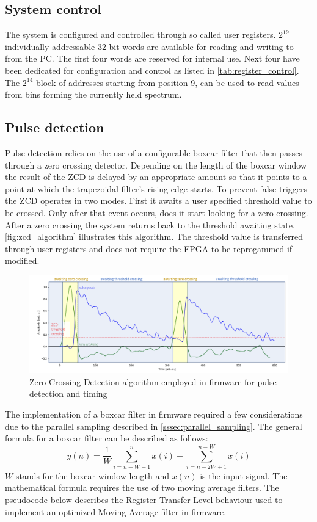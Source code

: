 \subsection{System control}

The system is configured and controlled through so called 
user registers. $2^{19}$ individually addressable 32-bit words
are available for reading and writing to from the PC. The first
four words are reserved for internal use. Next four have been 
dedicated for configuration and control as listed in \autoref{tab:register_control}.
The $2^{14}$ block of addresses starting from position 9, can
be used to read values from bins forming the currently held spectrum.

\subsection{Pulse detection}
Pulse detection relies on the use of a configurable boxcar filter
that then passes through a zero crossing detector. Depending on the
length of the boxcar window the result of the ZCD is delayed by an appropriate
amount so that it points to a point at which the trapezoidal filter's 
rising edge starts. To prevent false triggers the ZCD operates in two modes.
First it awaits a user specified threshold value to be crossed. Only after
that event occurs, does it start looking for a zero crossing.
After a zero crossing the system returns back to the threshold awaiting state.
\autoref{fig:zcd_algorithm} illustrates this algorithm. 
The threshold value is transferred through user registers and does not require
the FPGA to be reprogammed if modified.

\begin{figure}[H]
  \centering
  \includegraphics[width=\linewidth]{media/zcd_algorithm.png}
  \caption{Zero Crossing Detection algorithm employed in firmware for pulse detection and timing}
  \label{fig:zcd_algorithm} 
\end{figure}


The implementation of a boxcar filter in firmware required a few considerations
due to the parallel sampling described in \autoref{sssec:parallel_sampling}.
The general formula for a boxcar filter can be described as follows:
$$y(n) = \frac{1}{W} \sum^n_{i=n-W+1}x(i) - \sum^{n-W}_{i=n-2W+1}x(i)$$
$W$ stands for the boxcar window length and $x(n)$ is the input signal.
The mathematical formula requires the use of two moving average filters.
The pseudocode below describes the Register Transfer Level behaviour 
used to implement an optimized Moving Average filter in firmware.

